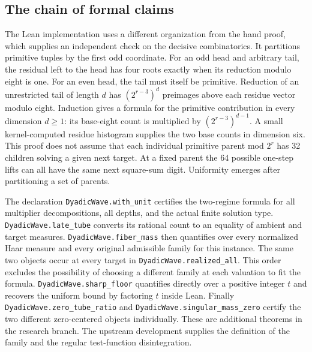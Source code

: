 \documentclass[12pt,letterpaper]{article}
\begin{document}
\subsection{The chain of formal claims}
The Lean implementation uses a different organization from the hand proof, which supplies an independent check on the decisive combinatorics. It partitions primitive tuples by the first odd coordinate. For an odd head and arbitrary tail, the residual left to the head has four roots exactly when its reduction modulo eight is one. For an even head, the tail must itself be primitive. Reduction of an unrestricted tail of length $d$ has $(2^{r-3})^d$ preimages above each residue vector modulo eight. Induction gives a formula for the primitive contribution in every dimension $d\ge1$: its base-eight count is multiplied by $(2^{r-3})^{d-1}$. A small kernel-computed residue histogram supplies the two base counts in dimension six. This proof does not assume that each individual primitive parent mod $2^r$ has 32 children solving a given next target. At a fixed parent the 64 possible one-step lifts can all have the same next square-sum digit. Uniformity emerges after partitioning a set of parents.

The declaration \texttt{DyadicWave.with\_unit} certifies the two-regime formula for all multiplier decompositions, all depths, and the actual finite solution type. \texttt{DyadicWave.late\_tube} converts its rational count to an equality of ambient and target measures. \texttt{DyadicWave.fiber\_mass} then quantifies over every normalized Haar measure and every original admissible family for this instance. The same two objects occur at every target in \texttt{DyadicWave.realized\_all}. This order excludes the possibility of choosing a different family at each valuation to fit the formula. \texttt{DyadicWave.sharp\_floor} quantifies directly over a positive integer $t$ and recovers the uniform bound by factoring $t$ inside Lean. Finally \texttt{DyadicWave.zero\_tube\_ratio} and \texttt{DyadicWave.singular\_mass\_zero} certify the two different zero-centered objects individually. These are additional theorems in the research branch. The upstream development supplies the definition of the family and the regular test-function disintegration.
\end{document}

